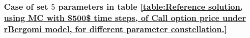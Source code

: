 \documentclass[11pt]{article}
\begin{document}


%





\subsubsection{Case of set $5$ parameters in table \ref{table:Reference solution, using MC with $500$ time steps, of Call option price under rBergomi model, for different parameter constellation.}}\label{sec:Case of set 5 parameters}
\end{document}
